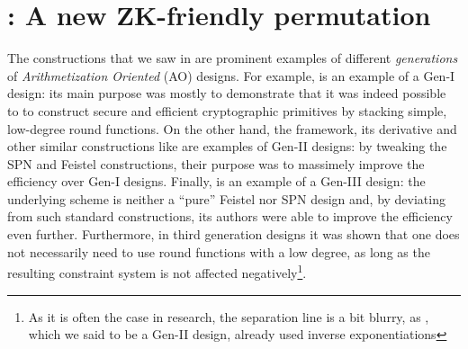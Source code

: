\section{\Arion: A new ZK-friendly permutation}\label{sec:gtds}
The constructions that we saw in  are prominent examples of different 
\emph{generations} of \emph{Arithmetization Oriented} (AO) designs.
For example, \Mimc{} is an example of a Gen-I design: its main purpose was mostly to demonstrate 
that it was indeed possible to to construct secure and efficient cryptographic primitives by 
stacking simple, low-degree round functions.
On the other hand, the \Hades{} framework, its derivative \Poseidon{} and other similar 
constructions like \Rescue{} are examples of Gen-II designs: by tweaking the SPN and 
Feistel constructions, their purpose was to massimely improve the efficiency over Gen-I designs.
Finally, \Griffin{} is an example of a Gen-III design: the underlying \Horst{} scheme is neither 
a ``pure'' Feistel nor SPN design and, by deviating from such standard constructions, its authors 
were able to improve the efficiency even further. 
Furthermore, in third generation designs it was shown that one does not necessarily need to use 
round functions with a low degree, as long as the resulting constraint system is not affected 
negatively\footnote{As it is often the case in research, the separation line is a bit blurry, 
as \Rescue, which we said to be a Gen-II design, already used inverse exponentiations}.

